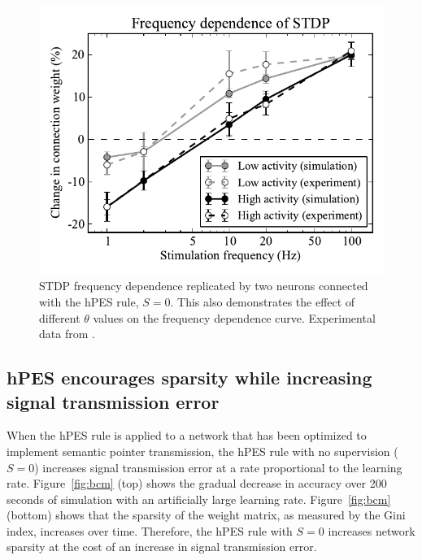 \documentclass[10pt,letterpaper]{article}
\begin{document}
\begin{figure}[ht]
\begin{center}
\includegraphics[width=\columnwidth]{fig2-bcm-stdp-frequency}
\end{center}
\caption{STDP frequency dependence replicated by two neurons
  connected with the hPES rule, $S = 0$.
  This also demonstrates the effect of different $\theta$
  values on the frequency dependence curve.
  Experimental data from .}
\label{fig:stdp-freq}
\end{figure}

\subsection{hPES encourages sparsity while increasing signal
  transmission error}

When the hPES rule is applied to
a network that has been optimized
to implement semantic pointer transmission,
the hPES rule with no supervision ($S = 0$)
increases signal transmission error at
a rate proportional to the learning rate.
Figure~\ref{fig:bcm} (top) shows the gradual
decrease in accuracy over 200 seconds of simulation
with an artificially large learning rate.
Figure~\ref{fig:bcm} (bottom) shows that the sparsity
of the weight matrix, as measured by the Gini index,
increases over time.
Therefore, the hPES rule with $S = 0$
increases network sparsity
at the cost of an increase in signal transmission error.
\end{document}
